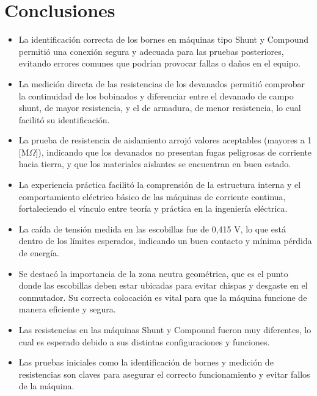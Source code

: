 \section{Conclusiones}
\label{sec:conclusiones}

\begin{itemize}
    \item La identificación correcta de los bornes en máquinas tipo Shunt y Compound permitió una conexión segura y adecuada para las pruebas posteriores, evitando errores comunes que podrían provocar fallas o daños en el equipo.
    \item La medición directa de las resistencias de los devanados permitió comprobar la continuidad de los bobinados y diferenciar entre el devanado de campo shunt, de mayor resistencia, y el de armadura, de menor resistencia, lo cual facilitó su identificación.
    \item La prueba de resistencia de aislamiento arrojó valores aceptables (mayores a 1 [M$\Omega$]), indicando que los devanados no presentan fugas peligrosas de corriente hacia tierra, y que los materiales aislantes se encuentran en buen estado.
    \item La experiencia práctica facilitó la comprensión de la estructura interna y el comportamiento eléctrico básico de las máquinas de corriente continua, fortaleciendo el vínculo entre teoría y práctica en la ingeniería eléctrica.
    \item La caída de tensión medida en las escobillas fue de 0,415 V, lo que está dentro de los límites esperados, indicando un buen contacto y mínima pérdida de energía.
    \item Se destacó la importancia de la zona neutra geométrica, que es el punto donde las escobillas deben estar ubicadas para evitar chispas y desgaste en el conmutador. Su correcta colocación es vital para que la máquina funcione de manera eficiente y segura.
    \item Las resistencias en las máquinas Shunt y Compound fueron muy diferentes, lo cual es esperado debido a sus distintas configuraciones y funciones.
    \item Las pruebas iniciales como la identificación de bornes y medición de resistencias son claves para asegurar el correcto funcionamiento y evitar fallos de la máquina.
\end{itemize}
